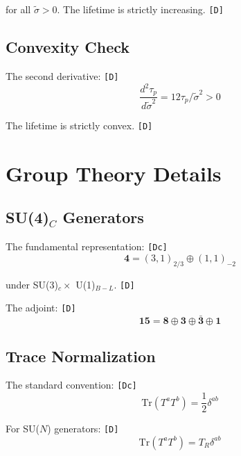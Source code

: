 \documentclass[11pt,a4paper]{article}
\newcommand{\tagD}{\textcolor{green!50!black}{\texttt{[D]}}}
\newcommand{\tagDc}{\textcolor{blue!70!black}{\texttt{[Dc]}}}
\theoremstyle{definition}
\begin{document}
for all $\tilde{\sigma} > 0$. The lifetime is strictly increasing. \tagD{}

\subsection{Convexity Check}
\label{app:convex}

The second derivative: \tagD{}
\begin{equation}
\label{eq:convex-1}
\frac{d^2\tau_p}{d\tilde{\sigma}^2} = 12\tau_p/\tilde{\sigma}^2 > 0
\end{equation}

The lifetime is strictly convex. \tagD{}

\section{Group Theory Details}
\label{app:group-theory}

\subsection{SU(4)$_C$ Generators}
\label{app:su4-gen}

The fundamental representation: \tagDc{}
\begin{equation}
\label{eq:su4-fund}
\mathbf{4} = (3, 1)_{2/3} \oplus (1, 1)_{-2}
\end{equation}

under SU(3)$_c \times$ U(1)$_{B-L}$. \tagD{}

The adjoint: \tagD{}
\begin{equation}
\label{eq:su4-adj}
\mathbf{15} = \mathbf{8} \oplus \mathbf{3} \oplus \bar{\mathbf{3}} \oplus \mathbf{1}
\end{equation}

\subsection{Trace Normalization}
\label{app:trace-norm}

The standard convention: \tagDc{}
\begin{equation}
\label{eq:trace-norm-1}
\text{Tr}(T^a T^b) = \frac{1}{2}\delta^{ab}
\end{equation}

For SU($N$) generators: \tagD{}
\begin{equation}
\label{eq:trace-norm-2}
\text{Tr}(T^a T^b) = T_R \delta^{ab}
\end{equation}
\end{document}
